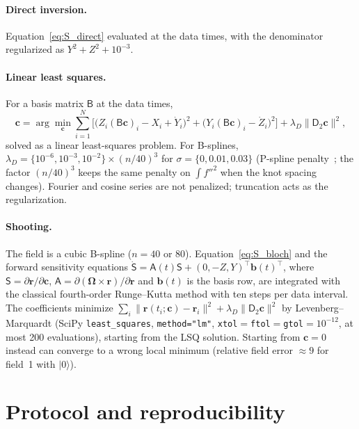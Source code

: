 \documentclass[aps,pra,onecolumn,superscriptaddress,11pt,longbibliography,floatfix,nofootinbib]{revtex4-2}
\newcommand{\rvec}{\bm r}
\begin{document}
\paragraph{Direct inversion.} Equation~\eqref{eq:S_direct} evaluated at the data times, with the
denominator regularized as $Y^2+Z^2+10^{-3}$.

\paragraph{Linear least squares.} For a basis matrix $\mathsf B$ at the data times,
\begin{equation}
  \bm c=\arg\min_{\bm c}\sum_{i=1}^{N}\Big[\big(Z_i(\mathsf B\bm c)_i-X_i+\dot Y_i\big)^2
  +\big(Y_i(\mathsf B\bm c)_i-\dot Z_i\big)^2\Big]+\lambda_D\|\mathsf D_2\bm c\|^2,
\end{equation}
solved as a linear least-squares problem. For B-splines,
$\lambda_D=\{10^{-6},10^{-3},10^{-2}\}\times(n/40)^3$ for $\sigma=\{0,0.01,0.03\}$ (P-spline
penalty~\cite{eilers1996psplines}; the factor $(n/40)^3$ keeps the same penalty on $\int f''^2$ when the
knot spacing changes). Fourier and cosine series are not penalized; truncation acts as the
regularization.

\paragraph{Shooting.} The field is a cubic B-spline ($n=40$ or $80$). Equation~\eqref{eq:S_bloch} and the
forward sensitivity equations $\dot{\mathsf S}=\mathsf A(t)\mathsf S+(0,-Z,Y)^{\top}\bm b(t)^{\top}$, where
$\mathsf S=\partial\rvec/\partial\bm c$, $\mathsf A=\partial(\bm\Omega\times\rvec)/\partial\rvec$ and
$\bm b(t)$ is the basis row, are integrated with the classical fourth-order Runge--Kutta method with ten
steps per data interval. The coefficients minimize $\sum_i\|\rvec(t_i;\bm c)-\rvec_i\|^2+\lambda_D\|\mathsf
D_2\bm c\|^2$ by Levenberg--Marquardt (SciPy \texttt{least\_squares}, \texttt{method="lm"},
\texttt{xtol}$=$\texttt{ftol}$=$\texttt{gtol}$=10^{-12}$, at most 200 evaluations), starting from the LSQ
solution. Starting from $\bm c=0$ instead can converge to a wrong local minimum (relative field error
$\approx9$ for field~1 with $|0\rangle$).

\section{Protocol and reproducibility}\label{sec:protocol}
\end{document}
